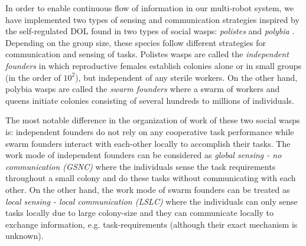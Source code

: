 In order to enable continuous flow of information in our multi-robot system, we have implemented two types of sensing and communication strategies inspired by the self-regulated DOL found in two types of social wasps: {\em polistes} and {\em polybia} \cite{Jeanne1999}. Depending on the group size, these species follow different strategies for communication and sensing of tasks. Polistes wasps are called the {\em independent founders} in which reproductive females establish colonies alone or in small groups (in the order of $10^2$), but independent of any sterile workers. On the other hand, polybia wasps are called the {\em swarm founders} where a swarm of workers and queens initiate colonies consisting of several hundreds to millions of individuals.

The most notable difference in the organization of work of these two social wasps is: independent founders do not rely on any cooperative task performance while swarm founders interact with each-other locally to accomplish their tasks. The work mode of independent founders can be considered as {\em global sensing - no communication (GSNC)} where the individuals sense the task requirements throughout a small colony and do these tasks without communicating with each other. On the other hand, the work mode of swarm founders can be treated as {\em local sensing - local communication (LSLC)} where the individuals can only sense tasks locally due to large colony-size and they can communicate locally to exchange information, e.g. task-requirements (although their exact mechanism is unknown).

